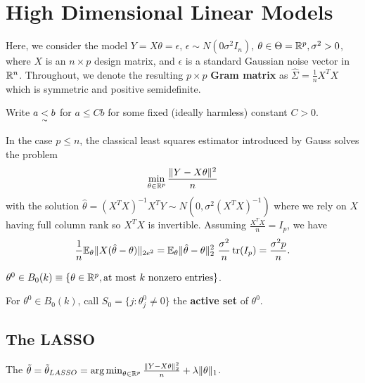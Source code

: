 \section{High Dimensional Linear Models}
\label{sec:high-dimens-line-1}

Here, we consider the model $Y = X \theta = \epsilon$, $\epsilon \sim
N(0 \sigma^{2} I_{n})$, $\theta \in \Theta = \mathbb{R}^{p}, \sigma^{2} > 0$,
where $X$ is an $n \times p$ design matrix, and $\epsilon$ is a
standard Gaussian noise vector in $\mathbb{R}^{n}$.  Throughout, we denote the
resulting $p \times p$ \textbf{Gram matrix} as $\hat \Sigma =
\frac{1}{n} X^{T} X$ which is symmetric and positive semidefinite.

Write $a \underset{\sim}{<} b$ for $a \leq C b$ for some fixed (ideally
harmless) constant $C > 0$.

\begin{thm}
  In the case $p \leq n$, the classical least squares estimator
  introduced by Gauss solves the problem
  \begin{equation}
    \label{eq:30} \min_{\theta \in \mathbb{R}^{p}} \frac{\| Y - X \theta
      \|^{2}}{n}
  \end{equation}
  with the solution $\hat \theta = (X^{T}X)^{-1} X^{T}Y \sim N(0,
  \sigma^{2}(X^{T} X)^{-1})$ where we rely on $X$ having full column
  rank so $X^{T} X$ is invertible.  Assuming $\frac{X^{T} X}{n} =
  I_{p}$, we have
  \begin{align}
    \label{eq:13}
    \frac{1}{n} \E_{\theta} \| X(\hat \theta - \theta) \|_{2e^{2}} =
    \E_{\theta} \| \hat \theta - \theta \|_{2}^{2} \
    \frac{\sigma^{2}}{n} \tr(I_{p}) = \frac{\sigma^{2} p }{n}.
  \end{align}
\end{thm}

\begin{defn}
  \label{sec:case-p-leq}
  $\theta^{0} \in B_{0}(k) \equiv \{ \theta \in \mathbb{R}^{p}, \text{at most
    $k$ nonzero entries} \} $.

  For $\theta^{0} \in B_{0}(k)$, call $S_{0} = \{ j : \theta_{j}^{0}
  \neq 0 \} $ the \textbf{active set} of $\theta^{0}$.
\end{defn}

\subsection{The LASSO}
\label{sec:lasso}

\begin{defn}
  \label{sec:case-p-leq-1}
  The $\tilde \theta = \tilde \theta_{LASSO} = \operatorname*{arg\,min}_{\theta \in
    \mathbb{R}^{p}} \frac{\| Y - X \theta \|_{2}^{2}}{n}  + \lambda \| \theta \|_{1}$.
\end{defn}

